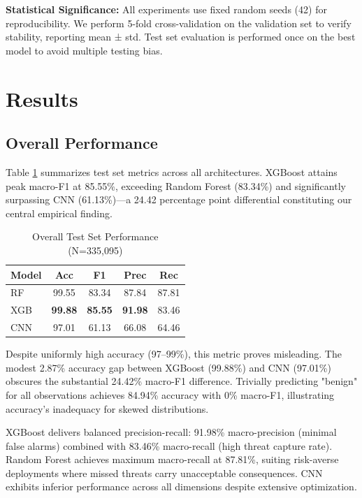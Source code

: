 \documentclass[10pt,twocolumn]{article}
\begin{document}
\textbf{Statistical Significance:} All experiments use fixed random seeds (42) for reproducibility. We perform 5-fold cross-validation on the validation set to verify stability, reporting mean ± std. Test set evaluation is performed once on the best model to avoid multiple testing bias.

\section{Results}

\subsection{Overall Performance}

Table \ref{tab:overall} summarizes test set metrics across all architectures. XGBoost attains peak macro-F1 at 85.55\%, exceeding Random Forest (83.34\%) and significantly surpassing CNN (61.13\%)—a 24.42 percentage point differential constituting our central empirical finding.

\begin{table}[htbp]
\caption{Overall Test Set Performance (N=335,095)}
\label{tab:overall}
\centering
\begin{tabular}{lcccc}
\toprule
\textbf{Model} & \textbf{Acc} & \textbf{F1} & \textbf{Prec} & \textbf{Rec} \\
\midrule
RF & 99.55 & 83.34 & 87.84 & 87.81 \\
XGB & \textbf{99.88} & \textbf{85.55} & \textbf{91.98} & 83.46 \\
CNN & 97.01 & 61.13 & 66.08 & 64.46 \\
\bottomrule
\end{tabular}
\end{table}

Despite uniformly high accuracy (97--99\%), this metric proves misleading. The modest 2.87\% accuracy gap between XGBoost (99.88\%) and CNN (97.01\%) obscures the substantial 24.42\% macro-F1 difference. Trivially predicting "benign" for all observations achieves 84.94\% accuracy with 0\% macro-F1, illustrating accuracy's inadequacy for skewed distributions.

XGBoost delivers balanced precision-recall: 91.98\% macro-precision (minimal false alarms) combined with 83.46\% macro-recall (high threat capture rate). Random Forest achieves maximum macro-recall at 87.81\%, suiting risk-averse deployments where missed threats carry unacceptable consequences. CNN exhibits inferior performance across all dimensions despite extensive optimization.
\end{document}
